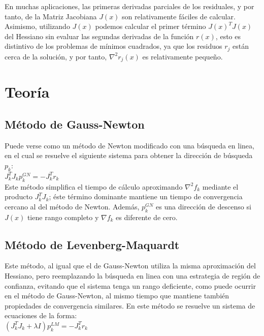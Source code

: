 \documentclass[10pt,journal,compsoc]{styles/IEEEtran}
\begin{document}
En muchas aplicaciones, las primeras derivadas parciales de los residuales, y por tanto, de la Matriz Jacobiana $J(x)$ son relativamente fáciles de calcular. Asimismo, utilizando $J(x)$ podemos calcular el primer t\'ermino $J(x)^T J(x)$ del Hessiano sin evaluar las segundas derivadas de la función $r(x)$, esto es distintivo de los problemas de mínimos cuadrados, ya que los residuos $r_j$ están cerca de la solución, y por tanto, $\nabla^2 r_j (x)$ es relativamente pequeño.\\

\section{Teoría}

\subsection{M\'etodo de Gauss-Newton}

Puede verse como un método de Newton modificado con una búsqueda en linea, en el cual se resuelve el siguiente sistema para obtener la dirección de búsqueda $p_k$:\\

$J_k^T J_k p_k^{GN}=-J_k^{T} r_k$\\

Este método simplifica el tiempo de c\'alculo aproximando $\nabla ^2 f_k$ mediante el producto $J_k^T J_k$; \'este t\'ermino dominante mantiene un tiempo de convergencia cercano al del método de Newton. Además, $p_k^{GN}$ es una dirección de descenso si $J(x)$ tiene rango completo y $\nabla f_k$ es diferente de cero.\\

\subsection{M\'etodo de Levenberg-Maquardt}

Este método, al igual que el de Gauss-Newton utiliza la misma aproximación del Hessiano, pero reemplazando la búsqueda en linea con una estrategia de región de confianza, evitando que el sistema tenga un rango deficiente, como puede ocurrir en el método de Gauss-Newton, al mismo tiempo que mantiene también propiedades de convergencia similares. En este método se resuelve un sistema de ecuaciones de la forma:\\

$(J_k^T J_k+\lambda I)p_k^{LM}=-J_k^T r_k$\\
\end{document}

